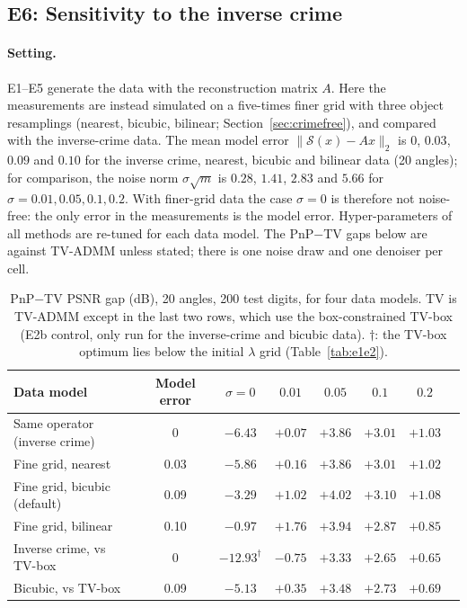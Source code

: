 \subsection{E6: Sensitivity to the inverse crime}\label{sec:crime-results}
\paragraph{Setting.}
E1--E5 generate the data with the reconstruction matrix $A$. Here the measurements are instead simulated on a five-times finer grid with three object resamplings (nearest, bicubic, bilinear; Section~\ref{sec:crimefree}), and compared with the inverse-crime data. The mean model error
$\lVert\mathcal{S}(x)-Ax\rVert_2$ is $0$, $0.03$, $0.09$ and $0.10$ for the inverse crime, nearest, bicubic and bilinear data (20 angles); for comparison, the noise norm $\sigma\sqrt m$ is $0.28$, $1.41$, $2.83$ and $5.66$ for $\sigma=0.01,0.05,0.1,0.2$.
With finer-grid data the case $\sigma=0$ is therefore not noise-free: the only error in the measurements is the model error. Hyper-parameters of all methods are re-tuned for each data model. The PnP$-$TV gaps below are against TV-ADMM unless stated; there is one noise draw and one denoiser per cell.

\begin{table}[htbp]
\centering\small\setlength{\tabcolsep}{5pt}
\caption{PnP$-$TV PSNR gap (dB), 20 angles, 200 test digits, for four data models. TV is TV-ADMM except in the last two rows, which use the box-constrained TV-box (E2b control, only run for the inverse-crime and bicubic data).
$\dagger$: the TV-box optimum lies below the initial $\lambda$ grid (Table~\ref{tab:e1e2}).}\label{tab:crime}
\begin{tabular}{lccccccc}
\toprule
Data model & Model error & $\sigma=0$ & $0.01$ & $0.05$ & $0.1$ & $0.2$\\
\midrule
Same operator (inverse crime)            & 0     & $-6.43$ & $+0.07$ & $+3.86$ & $+3.01$ & $+1.03$\\
Fine grid, nearest                       & 0.03  & $-5.86$ & $+0.16$ & $+3.86$ & $+3.01$ & $+1.02$\\
Fine grid, bicubic (default)             & 0.09  & $-3.29$ & $+1.02$ & $+4.02$ & $+3.10$ & $+1.08$\\
Fine grid, bilinear                      & 0.10  & $-0.97$ & $+1.76$ & $+3.94$ & $+2.87$ & $+0.85$\\
\midrule
Inverse crime, vs TV-box                 & 0     & $-12.93^\dagger$ & $-0.75$ & $+3.33$ & $+2.65$ & $+0.65$\\
Bicubic, vs TV-box                       & 0.09  & $-5.13$ & $+0.35$ & $+3.48$ & $+2.73$ & $+0.69$\\
\bottomrule
\end{tabular}
\end{table}

